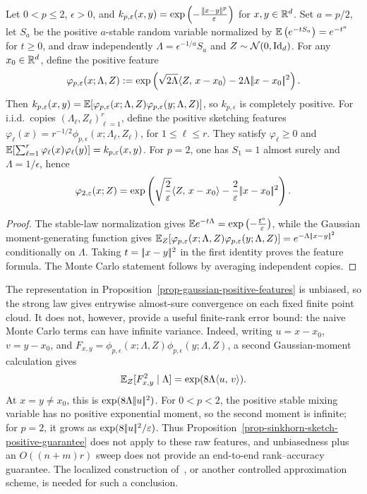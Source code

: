 \begin{prop}
\label{prop-gaussian-positive-features}
Let \(0<p\leq2\), \(\epsilon>0\), and
	$k_{p,\varepsilon}(x,y) = \exp\left( -\frac{|\!| x-y |\!|^p}{\varepsilon} \right)$ for $x,y\in\mathbb{R}^d$.
Set \(a=p/2\), let \(S_a\) be the positive \(a\)-stable random variable normalized by
$\mathbb{E}\left( e^{-tS_a} \right)=e^{-t^a}$ for $t\geq0$,
and draw independently \(\Lambda=\epsilon^{-1/a}S_a\) and \(Z\sim\mathcal{N}(0,\mathrm{Id}_d)\).
For any \(x_0\in\mathbb{R}^d\), define the positive feature
\[
	\varphi_{p,\varepsilon}(x;\Lambda,Z)
	:=
	\exp\left( 
		\sqrt{2\Lambda}\langle Z,\,x-x_0\rangle
		-2\Lambda|\!| x-x_0 |\!|^2
	 \right).
\]
Then \(k_{p,\varepsilon}(x,y)=\mathbb{E}[\varphi_{p,\varepsilon}(x;\Lambda,Z)\varphi_{p,\varepsilon}(y;\Lambda,Z)]\), so \(k_{p,\epsilon}\) is completely positive. For i.i.d.\ copies \((\Lambda_\ell,Z_\ell)_{\ell=1}^r\), define the positive sketching features \(\varphi_\ell(x)=r^{-1/2}\phi_{p,\epsilon}(x;\Lambda_\ell,Z_\ell)\), for \(1\leq\ell\leq r\).
They satisfy \(\varphi_\ell\geq0\) and \(\mathbb{E}[\sum_{\ell=1}^r\varphi_\ell(x)\varphi_\ell(y)]=k_{p,\varepsilon}(x,y)\). For \(p=2\), one has \(S_1=1\) almost surely and \(\Lambda=1/\epsilon\), hence
\[
	\varphi_{2,\varepsilon}(x;Z)
	=
	\exp\left( 
		\sqrt{\frac{2}{\varepsilon}}\langle Z,\,x-x_0\rangle
		-\frac{2}{\varepsilon}|\!| x-x_0 |\!|^2
	 \right).
\]
\end{prop}

\begin{proof}
The stable-law normalization gives
$\mathbb{E} e^{-t\Lambda} = \exp\left( -\frac{t^a}{\varepsilon} \right)$,
while the Gaussian moment-generating function gives \(\mathbb{E}_Z[\varphi_{p,\varepsilon}(x;\Lambda,Z)\varphi_{p,\varepsilon}(y;\Lambda,Z)]=e^{-\Lambda|\!| x-y |\!|^2}\) conditionally on \(\Lambda\).
Taking \(t=|\!| x-y |\!|^2\) in the first identity proves the feature formula. The Monte Carlo statement follows by averaging independent copies.
\end{proof}

The representation in Proposition~\ref{prop-gaussian-positive-features} is unbiased, so the strong law gives entrywise almost-sure convergence on each fixed finite point cloud. It does not, however, provide a useful finite-rank error bound: the naive Monte Carlo terms can have infinite variance. Indeed, writing $u=x-x_0$, $v=y-x_0$, and $F_{x,y}=\phi_{p,\epsilon}(x;\Lambda,Z)\phi_{p,\epsilon}(y;\Lambda,Z)$, a second Gaussian-moment calculation gives
\[
	\mathbb{E}_Z[F_{x,y}^2\mid\Lambda]
	=
	\exp(8\Lambda\langle u,\,v\rangle).
\]
At $x=y\neq x_0$, this is $\exp(8\Lambda|\!| u |\!|^2)$. For $0<p<2$, the positive stable mixing variable has no positive exponential moment, so the second moment is infinite; for $p=2$, it grows as $\exp(8|\!| u |\!|^2/\varepsilon)$. Thus Proposition~\ref{prop-sinkhorn-sketch-positive-guarantee} does not apply to these raw features, and unbiasedness plus an $O((n+m)r)$ sweep does not provide an end-to-end rank--accuracy guarantee. The localized construction of~\cite{ScetbonCuturi2020PositiveFeatures}, or another controlled approximation scheme, is needed for such a conclusion.

